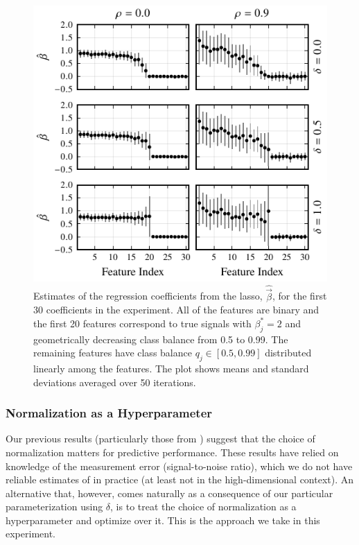 \begin{figure}[htpb]
  \centering
  \includegraphics[]{plots/binary_decreasing_small.pdf}
  \caption{%
    Estimates of the regression coefficients from the lasso, \(\hat{\vec{\beta}}\), for the
    first 30 coefficients in the experiment. All of the features are binary and the first 20
    features correspond to true signals with \(\beta_j^* = 2\) and geometrically decreasing
    class balance from 0.5 to 0.99. The remaining features have class balance \(q_j \in [0.5,
      0.99]\) distributed linearly among the features. The plot shows means and standard
    deviations averaged over 50 iterations.} \label{fig:binary-decreasing}
\end{figure}

\subsubsection{Normalization as a Hyperparameter}\label{sec:experiments-hyperparameter}

Our previous results (particularly those from ) suggest
that the choice of normalization matters for predictive performance. These results have
relied on knowledge of the measurement error (signal-to-noise ratio), which we do not have
reliable estimates of in practice (at least not in the high-dimensional context). An
alternative that, however, comes naturally as a consequence of our particular
parameterization using \(\delta\), is to treat the choice of normalization as a
hyperparameter and optimize over it. This is the approach we take in this experiment.

